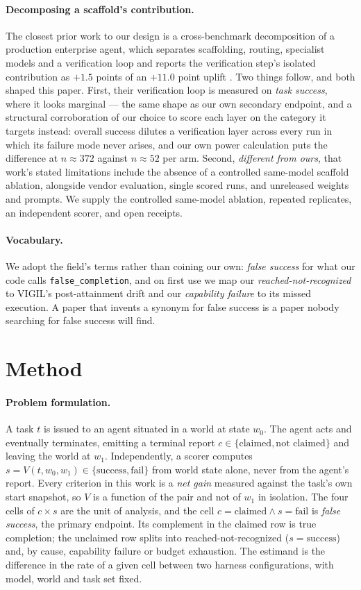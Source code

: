 \documentclass[11pt]{article}
\newcommand{\runin}[1]{\paragraph{#1}}
\begin{document}
\runin{Decomposing a scaffold's contribution.}
The closest prior work to our design is a cross-benchmark decomposition
of a production enterprise agent, which separates scaffolding, routing,
specialist models and a verification loop and reports the verification
step's isolated contribution as $+1.5$ points of an $+11.0$ point uplift
\citep{leni}. Two things follow, and both shaped this paper. First,
their verification loop is measured on \emph{task success}, where it
looks marginal --- the same shape as our own secondary endpoint, and a
structural corroboration of our choice to score each layer on the
category it targets instead: overall success dilutes a verification
layer across every run in which its failure mode never arises, and our
own power calculation puts the difference at $n \approx 372$ against
$n \approx 52$ per arm. Second, \emph{different from ours}, that work's
stated limitations include the absence of a controlled same-model
scaffold ablation, alongside vendor evaluation, single scored runs, and
unreleased weights and prompts. We supply the controlled same-model
ablation, repeated replicates, an independent scorer, and open receipts.

\runin{Vocabulary.}
We adopt the field's terms rather than coining our own: \emph{false
success} for what our code calls \texttt{false\_completion}, and on
first use we map our \emph{reached-not-recognized} to VIGIL's
post-attainment drift and our \emph{capability failure} to its missed
execution. A paper that invents a synonym for false success is a paper
nobody searching for false success will find.

\section{Method}
\label{sec:method}

\runin{Problem formulation.}
A task $t$ is issued to an agent situated in a world at state $w_0$. The
agent acts and eventually terminates, emitting a terminal report
$c \in \{\text{claimed}, \text{not claimed}\}$ and leaving the world at
$w_1$. Independently, a scorer computes
$s = V(t, w_0, w_1) \in \{\text{success}, \text{fail}\}$ from world
state alone, never from the agent's report. Every criterion in this work
is a \emph{net gain} measured against the task's own start snapshot, so
$V$ is a function of the pair and not of $w_1$ in isolation. The four
cells of $c \times s$ are the unit of analysis, and the cell
$c = \text{claimed} \wedge s = \text{fail}$ is \emph{false success}, the
primary endpoint. Its complement in the claimed row is true completion;
the unclaimed row splits into reached-not-recognized
($s = \text{success}$) and, by cause, capability failure or budget
exhaustion. The estimand is the difference in the rate of a given cell
between two harness configurations, with model, world and task set
fixed.
\end{document}
